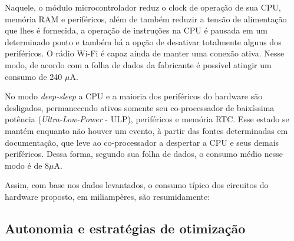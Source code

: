 Naquele, o módulo microcontrolador reduz o clock de operação de sua CPU, memória RAM e periféricos, além de também reduzir a tensão de alimentação que lhes é fornecida, a operação de instruções na CPU é pausada em um determinado ponto e também há a opção de desativar totalmente alguns dos periféricos. O rádio Wi-Fi é capaz ainda de manter uma conexão ativa. Nesse modo, de acordo com a folha de dados da fabricante é possível atingir um consumo de 240 $\mu$A. 

No modo \textit{deep-sleep} a CPU e a maioria dos periféricos do hardware são desligados, permanecendo ativos somente seu co-processador de baixíssima potência (\textit{Ultra-Low-Power} - ULP), periféricos e memória RTC. Esse estado se mantém enquanto não houver um evento, à partir das fontes determinadas em documentação, que leve ao co-processador a despertar a CPU e seus demais periféricos. Dessa forma, segundo sua folha de dados, o consumo médio nesse modo é de 8$\mu$A.

Assim, com base nos dados levantados, o consumo típico dos circuitos do hardware proposto, em miliampères, são resumidamente:

	\begin{table}[!h]
	\captionsetup{width=7cm}%
    \end{table}

\subsection{Autonomia e estratégias de otimização}

